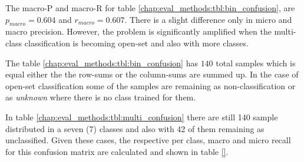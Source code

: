 {The macro-P and macro-R for table \ref{chap:eval_methods:tbl:bin_confusion}, are $p_{macro} = 0.604$ and $r_{macro} = 0.607$. There is a slight difference only in micro and macro precision. However, the problem is significantly amplified when the multi-class classification is becoming open-set and also with more classes.

The table \ref{chap:eval_methods:tbl:bin_confusion} has $140$ total samples which is equal either the the row-sums or the column-sums are summed up. In the case of open-set classification some of the samples are remaining as non-classification or as \textit{unknown} where there is no class trained for them. 

In table \ref{chap:eval_methods:tbl:multi_confusion} there are still 140 sample distributed in a seven (7) classes and also with 42 of them remaining as unclassified. Given these cases, the respective per class, macro and micro recall for this confusion matrix are calculated and shown in table \ref{}.

}
